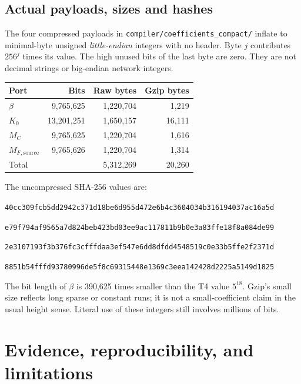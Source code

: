 \documentclass[11pt]{article}
\newcommand{\sha}[1]{\texttt{\small #1}}
\begin{document}
\subsection{Actual payloads, sizes and hashes}
The four compressed payloads in \texttt{compiler/coefficients\_compact/} inflate to minimal-byte unsigned \emph{little-endian} integers with no header. Byte $j$ contributes $256^j$ times its value. The high unused bits of the last byte are zero. They are not decimal strings or big-endian network integers.
\begin{center}\small
\begin{tabular}{@{}lrrr@{}}\toprule
Port & Bits & Raw bytes & Gzip bytes\\\midrule
$\beta$ &9,765,625&1,220,704&1,219\\
$K_0$ &13,201,251&1,650,157&16,111\\
$M_C$ &9,765,625&1,220,704&1,616\\
$M_{F,\mathrm{source}}$ &9,765,626&1,220,704&1,314\\\midrule
Total &&5,312,269&20,260\\\bottomrule
\end{tabular}\end{center}
The uncompressed SHA-256 values are:
\begin{description}[style=nextline]
\item[$\beta$] \sha{40cc309fcb5dd2942c371d18be6d955d472e6b4c3604034b316194037ac16a5d}
\item[$K_0$] \sha{e79f794af9565a7d824beb423bd03ee9ac117811b9b0e3a83ffe18f8a084de99}
\item[$M_C$] \sha{2e3107193f3b376fc3cfffdaa3ef547e6dd8dfdd4548519c0e33b5ffe2f2371d}
\item[$M_{F,\mathrm{source}}$] \sha{8851b54fffd93780996de5f8c69315448e1369c3eea142428d2225a5149d1825}
\end{description}
The bit length of $\beta$ is 390,625 times smaller than the T4 value $5^{18}$. Gzip's small size reflects long sparse or constant runs; it is not a small-coefficient claim in the usual height sense. Literal use of these integers still involves millions of bits.

\section{Evidence, reproducibility, and limitations}\label{sec:checks}
\end{document}
